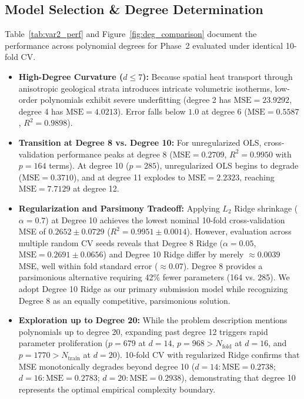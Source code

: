 \documentclass[10pt,twocolumn]{article}
\begin{document}
\subsection{Model Selection \& Degree Determination}
Table~\ref{tab:var2_perf} and Figure~\ref{fig:deg_comparison} document the performance across polynomial degrees for Phase~2 evaluated under identical 10-fold CV.
\begin{itemize}\setlength{\itemsep}{1pt}
    \item \textbf{High-Degree Curvature ($d \le 7$):} Because spatial heat transport through anisotropic geological strata introduces intricate volumetric isotherms, low-order polynomials exhibit severe underfitting (degree 2 has $\text{MSE}=23.9292$, degree 4 has $\text{MSE}=4.0213$). Error falls below $1.0$ at degree 6 ($\text{MSE}=0.5587$, $R^2=0.9898$).
    \item \textbf{Transition at Degree 8 vs. Degree 10:} For unregularized OLS, cross-validation performance peaks at degree 8 ($\text{MSE}=0.2709$, $R^2=0.9950$ with $p=164$ terms). At degree 10 ($p=285$), unregularized OLS begins to degrade ($\text{MSE}=0.3710$), and at degree 11 explodes to $\text{MSE}=2.2323$, reaching $\text{MSE}=7.7129$ at degree 12.
    \item \textbf{Regularization and Parsimony Tradeoff:} Applying $L_2$ Ridge shrinkage ($\alpha = 0.7$) at Degree 10 achieves the lowest nominal 10-fold cross-validation MSE of $\mathbf{0.2652 \pm 0.0729}$ ($R^2 = 0.9951 \pm 0.0014$). However, evaluation across multiple random CV seeds reveals that Degree 8 Ridge ($\alpha = 0.05$, $\text{MSE} = 0.2691 \pm 0.0656$) and Degree 10 Ridge differ by merely $\approx 0.0039$ MSE, well within fold standard error ($\approx 0.07$). Degree 8 provides a parsimonious alternative requiring 42\% fewer parameters (164 vs. 285). We adopt Degree 10 Ridge as our primary submission model while recognizing Degree 8 as an equally competitive, parsimonious solution.
    \item \textbf{Exploration up to Degree 20:} While the problem description mentions polynomials up to degree 20, expanding past degree 12 triggers rapid parameter proliferation ($p=679$ at $d=14$, $p=968 > N_{\text{fold}}$ at $d=16$, and $p=1770 > N_{\text{train}}$ at $d=20$). 10-fold CV with regularized Ridge confirms that MSE monotonically degrades beyond degree 10 ($d=14: \text{MSE}=0.2738$; $d=16: \text{MSE}=0.2783$; $d=20: \text{MSE}=0.2938$), demonstrating that degree 10 represents the optimal empirical complexity boundary.
\end{itemize}
\end{document}
